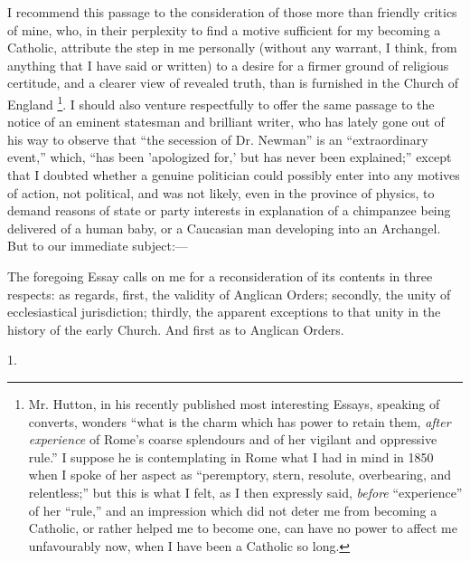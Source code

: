I recommend this passage to the consideration of those more than
friendly critics of mine, who, in their perplexity to find a motive
sufficient for my becoming a Catholic, attribute the step in me
personally (without any warrant, I think, from anything that I have
said or written) to a desire for a firmer ground of religious
certitude, and a clearer view of revealed truth, than is furnished in
the Church of England \footnote{Mr. Hutton, in his recently published most interesting Essays,
speaking of converts, wonders ``what is the charm which has power
to retain them, \emph{after experience} of Rome's coarse splendours
and of her vigilant and oppressive rule.'' I suppose he is
contemplating in Rome what I had in mind in 1850 when I spoke of her
aspect as ``peremptory, stern, resolute, overbearing, and
relentless;'' but this is what I felt, as I then expressly said, \emph{before}
``experience'' of her ``rule,'' and an impression
which did not deter me from becoming a Catholic, or rather helped me
to become one, can have no power to affect me unfavourably now, when I
have been a Catholic so long.}. I
should also venture respectfully to offer the same passage to the
notice of an eminent statesman and brilliant writer, who has lately
gone out of his way to observe that ``the secession of Dr.
Newman'' is an ``extraordinary event,'' which, ``has
been 'apologized for,' but has never been explained;'' except that
I doubted whether a genuine politician could possibly enter into any
motives of action, not political, and was not likely, even in the
province of physics, to demand reasons of state or party interests in
explanation of a chimpanzee being delivered of a human baby, or a
Caucasian man developing into an Archangel. But to our immediate
subject:—

The foregoing Essay calls on me for a reconsideration of its
contents in three respects: as regards, first, the validity of
Anglican Orders; secondly, the unity of ecclesiastical jurisdiction;
thirdly, the apparent exceptions to that unity in the history of the
early Church. And first as to Anglican Orders.

1.

